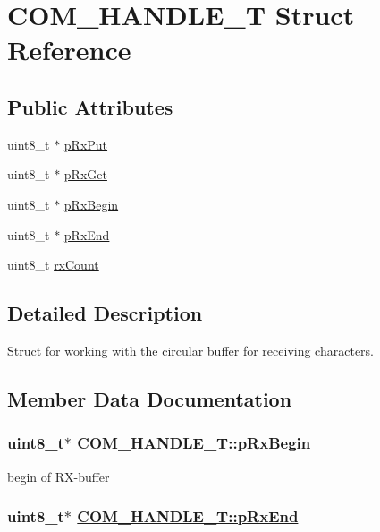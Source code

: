 \hypertarget{struct_c_o_m___h_a_n_d_l_e___t}{
\section{COM\_\-HANDLE\_\-T Struct Reference}
\label{struct_c_o_m___h_a_n_d_l_e___t}
}
\subsection*{Public Attributes}
\begin{CompactItemize}
\item 
uint8\_\-t $\ast$ \hyperlink{struct_c_o_m___h_a_n_d_l_e___t_o0}{p\-Rx\-Put}
\item 
uint8\_\-t $\ast$ \hyperlink{struct_c_o_m___h_a_n_d_l_e___t_o1}{p\-Rx\-Get}
\item 
uint8\_\-t $\ast$ \hyperlink{struct_c_o_m___h_a_n_d_l_e___t_o2}{p\-Rx\-Begin}
\item 
uint8\_\-t $\ast$ \hyperlink{struct_c_o_m___h_a_n_d_l_e___t_o3}{p\-Rx\-End}
\item 
uint8\_\-t \hyperlink{struct_c_o_m___h_a_n_d_l_e___t_o4}{rx\-Count}
\end{CompactItemize}


\subsection{Detailed Description}
Struct for working with the circular buffer for receiving characters. 



\subsection{Member Data Documentation}
\hypertarget{struct_c_o_m___h_a_n_d_l_e___t_o2}{
\subsubsection[pRxBegin]{\setlength{\rightskip}{0pt plus 5cm}uint8\_\-t$\ast$ \hyperlink{struct_c_o_m___h_a_n_d_l_e___t_o2}{COM\_\-HANDLE\_\-T::p\-Rx\-Begin}}}
\label{struct_c_o_m___h_a_n_d_l_e___t_o2}


begin of RX-buffer \hypertarget{struct_c_o_m___h_a_n_d_l_e___t_o3}{
\subsubsection[pRxEnd]{\setlength{\rightskip}{0pt plus 5cm}uint8\_\-t$\ast$ \hyperlink{struct_c_o_m___h_a_n_d_l_e___t_o3}{COM\_\-HANDLE\_\-T::p\-Rx\-End}}}
\label{struct_c_o_m___h_a_n_d_l_e___t_o3}


